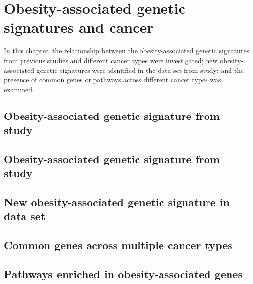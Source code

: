 \chapter{Obesity-associated genetic signatures and cancer}
\label{cha:obesity_genetic_signatures_and_cancer}

In this chapter, the relationship between the obesity-associated genetic signatures from previous studies and different cancer types were investigated; new obesity-associated genetic signatures were identified in the data set from \citet{Creighton2012} study; and the presence of common genes or pathways across different cancer types was examined.

\section{Obesity-associated genetic signature from \citet{Creighton2012} study}
\label{sec:creighton_obesity_metagene}










\section{Obesity-associated genetic signature from \citet{Fuentes-Mattei2014} study}
\label{sec:fm_obesity_metagene}










\section{New obesity-associated genetic signature in \citet{Creighton2012} data set}
\label{sec:creighton_obesity_metagene_new}










\section{Common genes across multiple cancer types}
\label{sec:common_genes_across_multiple_cancer_types}










\section{Pathways enriched in obesity-associated genes}
\label{sec:pathways_enriched_in_obesity_associated_genes}












